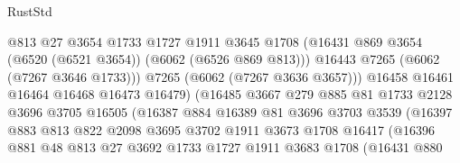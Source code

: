 \begin{lexlean}{RustStd}
\begin{coremodule}
                                  @813
                                  @27
                                  @3654
                                  @1733
                                  @1727
                                  @1911
                                  @3645
                                  @1708
                                  (@16431
                                    @869
                                    @3654
                                    (@6520 (@6521 @3654))
                                    (@6062 (@6526 @869 @813)))
                                  @16443
                                  @7265
                                  (@6062 (@7267 @3646 @1733)))
                                @7265
                                (@6062 (@7267 @3636 @3657)))
                              @16458
                              @16461
                              @16464
                              @16468
                              @16473
                              @16479)
                            (@16485
                              @3667
                              @279
                              @885
                              @81
                              @1733
                              @2128
                              @3696
                              @3705
                              @16505
                              (@16387
                                @884
                                @16389
                                @81
                                @3696
                                @3703
                                @3539
                                (@16397
                                  @883
                                  @813
                                  @822
                                  @2098
                                  @3695
                                  @3702
                                  @1911
                                  @3673
                                  @1708
                                  @16417
                                  (@16396
                                    @881
                                    @48
                                    @813
                                    @27
                                    @3692
                                    @1733
                                    @1727
                                    @1911
                                    @3683
                                    @1708
                                    (@16431
                                      @880

\end{coremodule}
\end{lexlean}
